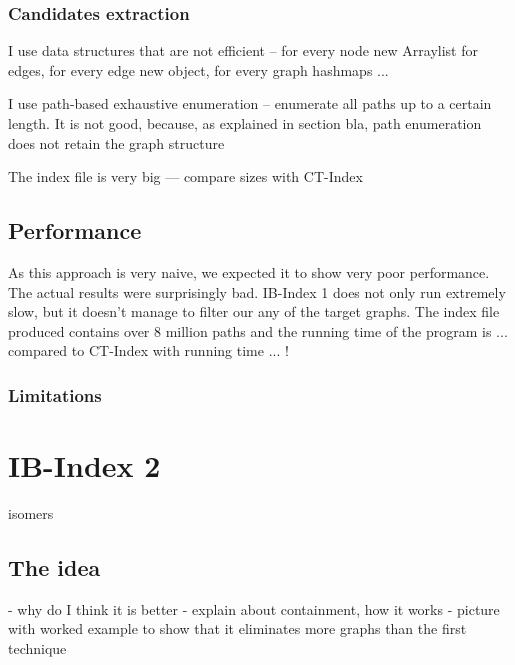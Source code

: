 \documentclass{l4proj}
\theoremstyle{definition}
\begin{document}


\subsubsection{Candidates extraction}
         
            I use data structures that are not efficient -- for every node new Arraylist for edges, for every edge new object, for every graph hashmaps ...
            
            I use path-based exhaustive enumeration -- enumerate all paths up to a certain length. It is not good, because, as explained in section bla, path enumeration does not retain the graph structure
            
            The index file is very big --- compare sizes with CT-Index
\subsection{Performance}
  As this approach is very naive, we expected it to show very poor performance. The actual results were surprisingly bad. IB-Index 1 does not only run extremely slow, but it doesn't manage to filter our any of the target graphs. The index file produced contains over 8 million paths and the running time of the program is ... compared to CT-Index with running time ... !
	\subsubsection{Limitations}



\section{IB-Index 2}    
  isomers
\subsection{The idea}
        - why do I think it is better
        - explain about containment, how it works
        - picture with worked example to show that it eliminates more graphs than the first technique
       
\end{document}
